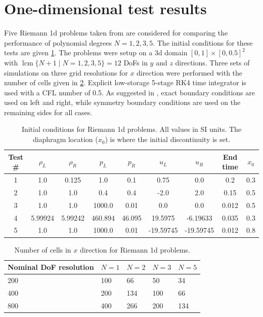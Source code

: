 \documentclass[a4paper,11pt,oneside]{article}
\newcommand{\citear}[1]{\citeauthor{#1} \cite{#1}} %
\DeclareMathOperator{\lcm}{lcm} %
\begin{document}
\section{One-dimensional test results}
\label{sec:1d_tests}

Five Riemann 1d problems taken from \citear{toro2009} are considered for comparing the performance of polynomial degrees $N=1,2,3,5$. The initial conditions for these tests are given \cref{tab:ic_riemann1d}. The problems were setup on a 3d domain $[0,1] \times [0,0.5]^2$ with $\lcm \{N+1 \mid N=1,2,3,5\}=12$ DoFs in $y$ and $z$ directions. Three sets of simulations on three grid resolutions for $x$ direction were performed with the number of cells given in \cref{tab:nx_riemann1d}. Explicit low-storage 5-stage RK4 time integrator \cite{kennedyCarpenterLewis2000} is used with a CFL number of 0.5. As suggested in \cite{mengaldoDeGraziaPeiro2014}, exact boundary conditions are used on left and right, while symmetry boundary conditions are used on the remaining sides for all cases.

\begin{table}[htbp]
	\centering
	\caption{Initial conditions for Riemann 1d problems. All values in SI units. The diaphragm location ($x_0$) is where the initial discontinuity is set.}
	\label{tab:ic_riemann1d}
	\begin{tabular}{c c c c c c c c c}
		\toprule
		Test \# & $\rho_L$ & $\rho_R$ & $p_L$ & $p_R$ & $u_L$ & $u_R$ & End time & $x_0$ \\ \midrule
		1 & 1.0 & 0.125 & 1.0 & 0.1 & 0.75 & 0.0 & 0.2 & 0.3 \\
		2 & 1.0 & 1.0 & 0.4 & 0.4 & -2.0 & 2.0 & 0.15 & 0.5 \\
		3 & 1.0 & 1.0 & 1000.0 & 0.01 & 0.0 & 0.0 & 0.012 & 0.5 \\
		4 & 5.99924 & 5.99242 & 460.894 & 46.095 & 19.5975 & -6.19633 & 0.035 & 0.3 \\
		5 & 1.0 & 1.0 & 1000.0 & 0.01 & -19.59745 & -19.59745 & 0.012 & 0.8 \\
		\bottomrule
	\end{tabular}
\end{table}

\begin{table}[htbp]
\centering
\caption{Number of cells in $x$ direction for Riemann 1d problems.}
\label{tab:nx_riemann1d}
\begin{tabular}{lllll}
	\toprule
	Nominal DoF resolution & $N=1$ & $N=2$ & $N=3$ & $N=5$\\
	\midrule
	200 & 100 & 66 & 50 & 34 \\
	400 & 200 & 134 & 100 & 66 \\
	800 & 400 & 266 & 200 & 134 \\
	\bottomrule
\end{tabular}
\end{table}
\end{document}

